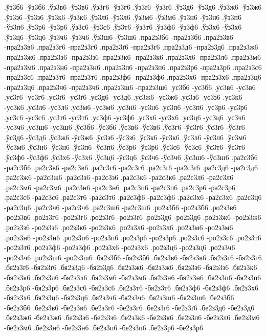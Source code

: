 {%
.ўз3б6 -ўз3б6
.ўз3в6 -ўз3в6
.ўз3г6 -ўз3г6
.ўз3ґ6 -ўз3ґ6
.ўз3д6 -ўз3д6
.ўз3ж6 -ўз3ж6
.ўз3з6 -ўз3з6
.ўз3к6 -ўз3к6
.ўз3л6 -ўз3л6
.ўз3м6 -ўз3м6
.ўз3н6 -ўз3н6
.ўз3п6 -ўз3п6
.ўз3р6 -ўз3р6
.ўз3с6 -ўз3с6
.ўз3т6 -ўз3т6
.ўз3ф6 -ўз3ф6
.ўз3х6 -ўз3х6
.ўз3ц6 -ўз3ц6
.ўз3ч6 -ўз3ч6
.ўз3ш6 -ўз3ш6
.пра2з3б6 -пра2з3б6
.пра2з3в6 -пра2з3в6
.пра2з3г6 -пра2з3г6
.пра2з3ґ6 -пра2з3ґ6
.пра2з3д6 -пра2з3д6
.пра2з3ж6 -пра2з3ж6
.пра2з3з6 -пра2з3з6
.пра2з3к6 -пра2з3к6
.пра2з3л6 -пра2з3л6
.пра2з3м6 -пра2з3м6
.пра2з3н6 -пра2з3н6
.пра2з3п6 -пра2з3п6
.пра2з3р6 -пра2з3р6
.пра2з3с6 -пра2з3с6
.пра2з3т6 -пра2з3т6
.пра2з3ф6 -пра2з3ф6
.пра2з3х6 -пра2з3х6
.пра2з3ц6 -пра2з3ц6
.пра2з3ч6 -пра2з3ч6
.пра2з3ш6 -пра2з3ш6
.ус3б6 -ус3б6
.ус3в6 -ус3в6
.ус3г6 -ус3г6
.ус3ґ6 -ус3ґ6
.ус3д6 -ус3д6
.ус3ж6 -ус3ж6
.ус3з6 -ус3з6
.ус3к6 -ус3к6
.ус3л6 -ус3л6
.ус3м6 -ус3м6
.ус3н6 -ус3н6
.ус3п6 -ус3п6
.ус3р6 -ус3р6
.ус3с6 -ус3с6
.ус3т6 -ус3т6
.ус3ф6 -ус3ф6
.ус3х6 -ус3х6
.ус3ц6 -ус3ц6
.ус3ч6 -ус3ч6
.ус3ш6 -ус3ш6
.ўс3б6 -ўс3б6
.ўс3в6 -ўс3в6
.ўс3г6 -ўс3г6
.ўс3ґ6 -ўс3ґ6
.ўс3д6 -ўс3д6
.ўс3ж6 -ўс3ж6
.ўс3з6 -ўс3з6
.ўс3к6 -ўс3к6
.ўс3л6 -ўс3л6
.ўс3м6 -ўс3м6
.ўс3н6 -ўс3н6
.ўс3п6 -ўс3п6
.ўс3р6 -ўс3р6
.ўс3с6 -ўс3с6
.ўс3т6 -ўс3т6
.ўс3ф6 -ўс3ф6
.ўс3х6 -ўс3х6
.ўс3ц6 -ўс3ц6
.ўс3ч6 -ўс3ч6
.ўс3ш6 -ўс3ш6
.ра2с3б6 -ра2с3б6
.ра2с3в6 -ра2с3в6
.ра2с3г6 -ра2с3г6
.ра2с3ґ6 -ра2с3ґ6
.ра2с3д6 -ра2с3д6
.ра2с3ж6 -ра2с3ж6
.ра2с3з6 -ра2с3з6
.ра2с3к6 -ра2с3к6
.ра2с3л6 -ра2с3л6
.ра2с3м6 -ра2с3м6
.ра2с3н6 -ра2с3н6
.ра2с3п6 -ра2с3п6
.ра2с3р6 -ра2с3р6
.ра2с3с6 -ра2с3с6
.ра2с3т6 -ра2с3т6
.ра2с3ф6 -ра2с3ф6
.ра2с3х6 -ра2с3х6
.ра2с3ц6 -ра2с3ц6
.ра2с3ч6 -ра2с3ч6
.ра2с3ш6 -ра2с3ш6
.ро2з3б6 -ро2з3б6
.ро2з3в6 -ро2з3в6
.ро2з3г6 -ро2з3г6
.ро2з3ґ6 -ро2з3ґ6
.ро2з3д6 -ро2з3д6
.ро2з3ж6 -ро2з3ж6
.ро2з3з6 -ро2з3з6
.ро2з3к6 -ро2з3к6
.ро2з3л6 -ро2з3л6
.ро2з3м6 -ро2з3м6
.ро2з3н6 -ро2з3н6
.ро2з3п6 -ро2з3п6
.ро2з3р6 -ро2з3р6
.ро2з3с6 -ро2з3с6
.ро2з3т6 -ро2з3т6
.ро2з3ф6 -ро2з3ф6
.ро2з3х6 -ро2з3х6
.ро2з3ц6 -ро2з3ц6
.ро2з3ч6 -ро2з3ч6
.ро2з3ш6 -ро2з3ш6
.бя2з3б6 -бя2з3б6
.бя2з3в6 -бя2з3в6
.бя2з3г6 -бя2з3г6
.бя2з3ґ6 -бя2з3ґ6
.бя2з3д6 -бя2з3д6
.бя2з3ж6 -бя2з3ж6
.бя2з3з6 -бя2з3з6
.бя2з3к6 -бя2з3к6
.бя2з3л6 -бя2з3л6
.бя2з3м6 -бя2з3м6
.бя2з3н6 -бя2з3н6
.бя2з3п6 -бя2з3п6
.бя2з3р6 -бя2з3р6
.бя2з3с6 -бя2з3с6
.бя2з3т6 -бя2з3т6
.бя2з3ф6 -бя2з3ф6
.бя2з3х6 -бя2з3х6
.бя2з3ц6 -бя2з3ц6
.бя2з3ч6 -бя2з3ч6
.бя2з3ш6 -бя2з3ш6
.бе2з3б6 -бе2з3б6
.бе2з3в6 -бе2з3в6
.бе2з3г6 -бе2з3г6
.бе2з3ґ6 -бе2з3ґ6
.бе2з3д6 -бе2з3д6
.бе2з3ж6 -бе2з3ж6
.бе2з3з6 -бе2з3з6
.бе2з3к6 -бе2з3к6
.бе2з3л6 -бе2з3л6
.бе2з3м6 -бе2з3м6
.бе2з3н6 -бе2з3н6
.бе2з3п6 -бе2з3п6
.бе2з3р6 -бе2з3р6
}
